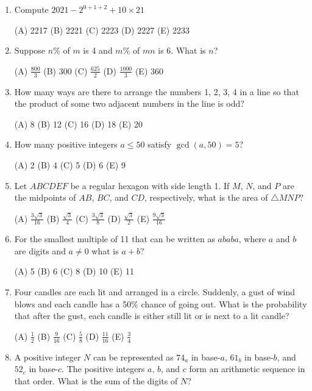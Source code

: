 \documentclass[12pt]{scrartcl}
\begin{document}
\newpage

\begin{enumerate}

\item Compute $2021-2^{0+1+2}+10\times21$

\quad (A) 2217 \quad (B) 2221 \quad (C) 2223 \quad (D) 2227 \quad (E) 2233

\item Suppose $n\%$ of $m$ is 4 and $m\%$ of $mn$ is 6. What is $n$?

\quad (A) $\frac{800}{3}$ \quad (B) 300 \quad (C) $\frac{625}{2}$ \quad (D) $\frac{1000}{3}$ \quad (E) 360

\item How many ways are there to arrange the numbers 1, 2, 3, 4 in a line so that the product of some two adjacent numbers in the line is odd?

\quad (A) 8 \quad (B) 12 \quad (C) 16 \quad (D) 18 \quad (E) 20

\item How many positive integers $a\le50$ satisfy $\gcd(a,50)=5?$

\quad (A) 2 \quad (B) 4 \quad (C) 5 \quad (D) 6 \quad (E) 9

\item Let $ABCDEF$ be a regular hexagon with side length 1. If $M$, $N$, and $P$ are the midpoints of $AB$, $BC$, and $CD$, respectively, what is the area of $\triangle MNP?$

\quad (A) $\frac{3\sqrt{3}}{16}$ \quad (B) $\frac{\sqrt{3}}{4}$ \quad (C) $\frac{3\sqrt{3}}{8}$ \quad (D) $\frac{\sqrt{3}}{2}$ \quad (E) $\frac{9\sqrt{3}}{16}$

\item For the smallest multiple of 11 that can be written as $ababa$, where $a$ and $b$ are digits and $a\ne0$ what is $a+b?$

\quad (A) 5 \quad (B) 6 \quad (C) 8 \quad (D) 10 \quad (E) 11

\item Four candles are each lit and arranged in a circle. Suddenly, a gust of wind blows and each candle has a 50\% chance of going out. What is the probability that after the gust, each candle is either still lit or is next to a lit candle?

\quad (A) $\frac{1}{2}$ \quad (B) $\frac{9}{16}$ \quad (C) $\frac{5}{8}$ \quad (D) $\frac{11}{16}$ \quad (E) $\frac{3}{4}$

\item A positive integer $N$ can be represented as $74_{a}$ in base-$a$, $61_{b}$ in base-$b$, and $52_{c}$ in base-$c$. The positive integers $a$, $b$, and $c$ form an arithmetic sequence in that order. What is the sum of the digits of $N$?


\end{enumerate}
\end{document}
